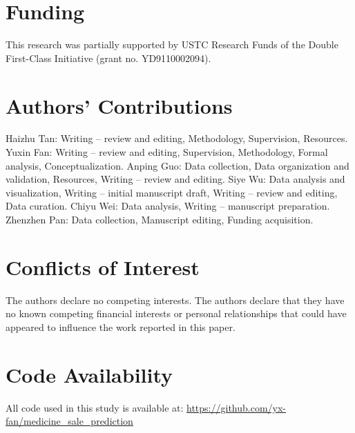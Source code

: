 \documentclass[12pt]{article}
\begin{document}
\section*{Funding}
This research was partially supported by USTC Research Funds of the Double First-Class Initiative (grant no. YD9110002094).

\section*{Authors' Contributions}

Haizhu Tan: Writing – review and editing, Methodology, Supervision, Resources. Yuxin Fan: Writing – review and editing, Supervision, Methodology, Formal analysis, Conceptualization. Anping Guo: Data collection, Data organization and validation, Resources, Writing – review and editing. Siye Wu: Data analysis and visualization, Writing – initial manuscript draft, Writing – review and editing, Data curation. Chiyu Wei: Data analysis, Writing – manuscript preparation. Zhenzhen Pan: Data collection, Manuscript editing, Funding acquisition.

\section*{Conflicts of Interest}
The authors declare no competing interests. The authors declare that they have no known competing financial interests or personal relationships that could have appeared to influence the work reported in this paper.

\section*{Code Availability}
All code used in this study is available at: \url{https://github.com/yx-fan/medicine_sale_prediction}

\end{document}
